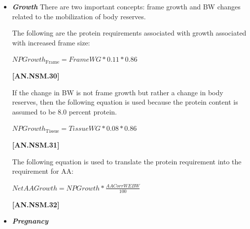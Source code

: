 \documentclass{article}
\begin{document}
\begin{refsection}
\begin{itemize}
\begin{enumerate}
\vspace{0.5cm}
            {\raggedleft \textbf{[AN.NSM.29]}\par}
            \vspace{0.5cm}
        
    \end{enumerate}
    \item \textbf{\textit{Growth}} There are two important concepts: frame growth and BW changes related to the mobilization of body reserves. 
    \vspace{0.2cm}
    
    The following are the protein requirements associated with growth associated with increased frame size:
    \begin{center}
    \(NPGrowth_{\text {Frame}} = FrameWG * 0.11 * 0.86\)
    \end{center}

\vspace{0.5cm}
            {\raggedleft \textbf{[AN.NSM.30]}\par}
            \vspace{0.5cm}
            
If the change in BW is not frame growth but rather a change in body reserves, then the following equation is used because the protein content is assumed to be 8.0 percent protein.
\vspace{0.2cm}

    \begin{center}
    \(NPGrowth_{\text {Tissue}} = TissueWG * 0.08 * 0.86\)
    \end{center}

\vspace{0.5cm}
            {\raggedleft \textbf{[AN.NSM.31]}\par}
            \vspace{0.5cm}

The following equation is used to translate the protein requirement into the requirement for AA:
\vspace{0.2cm}
    \begin{center}
    \(NetAAGrowth = NPGrowth * \frac{AACorrWEBW}{100}\)
    \end{center}

\vspace{0.5cm}
            {\raggedleft \textbf{[AN.NSM.32]}\par}
            \vspace{0.5cm}       

    \item \textbf{\textit{Pregnancy}}
\vspace{0.2cm}


\end{itemize}
\end{refsection}
\end{document}
